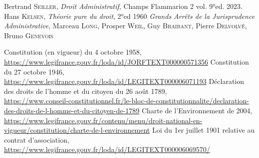 \documentclass[math]{cours}
\begin{document}
\begin{thebibliography}{255}
		Bertrand \textsc{Seiller}, \textit{Droit Administratif}, Champs Flammarion 2 vol. 9°ed. 2023.
		Hans \textsc{Kelsen}, \textit{Théorie pure du droit}, 2°ed 1960
		\textit{Grands Arrêts de la Jurisprudence Administrative}, Marceau \textsc{Long}, Prosper \textsc{Weil}, Guy \textsc{Braibant}, Pierre \textsc{Delvolvé}, Bruno \textsc{Genevois}



		Constitution (en vigueur) du 4 octobre 1958,\\
		\url{https://www.legifrance.gouv.fr/loda/id/JORFTEXT000000571356}
		Constitution du 27 octobre 1946,\\
		\url{https://www.legifrance.gouv.fr/loda/id/LEGITEXT000006071193}
		Déclaration des droits de l'homme et du citoyen du 26 août 1789,\\
		\url{https://www.conseil-constitutionnel.fr/le-bloc-de-constitutionnalite/declaration-des-droits-de-l-homme-et-du-citoyen-de-1789}
		Charte de l'Environnement de 2004,\\
		\url{https://www.legifrance.gouv.fr/contenu/menu/droit-national-en-vigueur/constitution/charte-de-l-environnement}
		Loi du 1er juillet 1901 relative au contrat d'association,\\
		\url{https://www.legifrance.gouv.fr/loda/id/LEGITEXT000006069570/}




\end{thebibliography}
\end{document}
